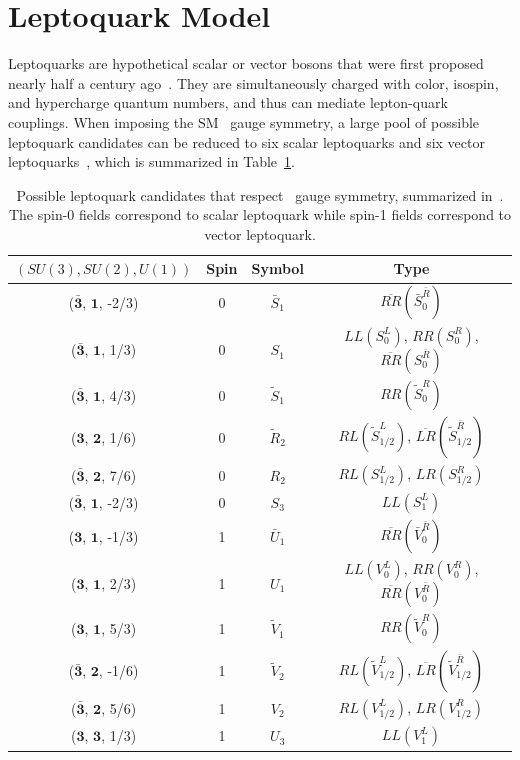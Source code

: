 \section{Leptoquark Model}
\label{sec:Leptoquark}

Leptoquarks are hypothetical scalar or vector bosons that were first proposed nearly half a century ago~\cite{Pati:1973uk}. They are simultaneously charged with color, isospin, and hypercharge quantum numbers, and thus can mediate lepton-quark couplings. When imposing the \ac{SM} \sm~gauge symmetry, a large pool of possible leptoquark candidates can be reduced to six scalar leptoquarks and six vector leptoquarks~\cite{Dorsner:2016wpm}, which is summarized in Table~\ref{tab:Leptoquark}. 

\begin{table}[th]
\sffamily
\centering
\caption{Possible leptoquark candidates that respect \sm~gauge symmetry, summarized in~\cite{Dorsner:2016wpm}. The spin-0 fields correspond to scalar leptoquark while spin-1 fields correspond to vector leptoquark.}
\begin{tabular}{cccc}
\toprule 
$(SU(3), SU(2), U(1))$ & Spin  & Symbol & Type \\ \midrule
($\bar{\bm{3}}$, $\bm{1}$, -2/3) & 0 & $\bar{S}_{1}$ & $\overline{RR}(\bar{S}_{0}^{\bar{R}})$ \\
($\bar{\bm{3}}$, $\bm{1}$, 1/3) & 0 & $S_{1}$ & $LL(S_{0}^{L})$, $RR(S_{0}^{R})$, $\overline{RR}(S_{0}^{\bar{R}})$ \\
($\bar{\bm{3}}$, $\bm{1}$, 4/3) & 0 & $\tilde{S}_{1}$ & $RR(\tilde{S}_{0}^{R})$ \\
($\bm{\bm{3}}$, $\bm{2}$, 1/6) & 0 & $\tilde{R}_{2}$ & $RL(\tilde{S}_{1/2}^{L})$, $\overline{LR}(\tilde{S}_{1/2}^{\bar{R}})$ \\
($\bar{\bm{3}}$, $\bm{2}$, 7/6) & 0 & $R_{2}$ & $RL(S_{1/2}^{L})$, $LR(S_{1/2}^{R})$ \\
($\bar{\bm{3}}$, $\bm{1}$, -2/3) & 0 & $S_{3}$ & $LL(S_{1}^{L})$\\
\midrule
($\bm{3}$, $\bm{1}$, -1/3) & 1 & $\bar{U}_{1}$ & $\overline{RR}(\bar{V}_{0}^{\bar{R}})$ \\
($\bm{3}$, $\bm{1}$, 2/3) & 1 & $U_{1}$ & $LL(V_{0}^{L})$, $RR(V_{0}^{R})$, $\overline{RR}(V_{0}^{\bar{R}})$ \\
($\bm{3}$, $\bm{1}$, 5/3) & 1 & $\tilde{V}_{1}$ & $RR(\tilde{V}_{0}^{R})$ \\
($\bar{\bm{3}}$, $\bm{2}$, -1/6) & 1 & $\tilde{V}_{2}$ & $RL(\tilde{V}_{1/2}^{L})$, $\overline{LR}(\tilde{V}_{1/2}^{\bar{R}})$ \\
($\bar{\bm{3}}$, $\bm{2}$, 5/6) & 1 & $V_{2}$ & $RL(V_{1/2}^{L})$, $LR(V_{1/2}^{R})$ \\
($\bm{3}$, $\bm{3}$, 1/3) & 1 & $U_{3}$ & $LL(V_{1}^{L})$\\
\bottomrule
\end{tabular}
\vspace{-0.5em}
\label{tab:Leptoquark}
\end{table}

